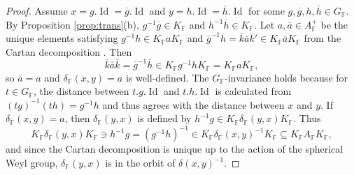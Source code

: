 \documentclass[12pt]{amsart}
\newcommand{\F}{\mathbb{F} }
\newcommand{\ApF}{A_\F^+}
\newcommand{\Id}{\operatorname{Id} }
\newcommand{\tran}{{^{\mathsf{T}}\!}}
\numberwithin{equation}{section}
\theoremstyle{remark} %
\begin{document}
\begin{proof}
	Assume $x=g.\Id = \overline{g}.\Id$ and $y=h.\Id = \overline{h}.\Id$ for some $g,\overline{g}, h, \overline{h} \in G_\F$. By Proposition \ref{prop:trans}(b), $g^{-1}\overline{g} \in K_\F$ and $h^{-1}\overline{h} \in K_\F$. Let $a,\overline{a}\in A_\F^+$ be the unique elements satisfying $g^{-1}h \in K_\F a K_\F$ and $\overline{g}^{-1}\overline{h} = \overline{k}\overline{a}\overline{k}' \in K_\F \overline{a} K_\F$ from the Cartan decomposition \cite[Theorem \ref{I-thm:KAK}]{AppAGRCF}. Then
	$$
	\overline{k}\overline{a}\overline{k}= \overline{g}^{-1}\overline{h} \in K_\F g^{-1}  h K_\F = K_\F a K_\F,
	$$
	so $\overline{a} = a$ and $\delta_\F(x,y) = a$ is well-defined. The $G_\F$-invariance holds because for $t \in G_\F$, the distance between $t.g.\Id$ and $t.h.\Id$ is calculated from $(t g)^{-1}(t h) = g^{-1}h$ and thus agrees with the distance between $x$ and $y$. If $\delta_\F(x,y) = a$, then $\delta_\F(y,x)$ is defined by $h^{-1}g \in K_\F \delta_\F(y,x) K_\F$. Thus 
	$$
	K_\F \delta_\F(y,x) K_\F \ni h^{-1}g = (g^{-1}h)^{-1} \in K_\F \delta_\F(x,y)^{-1} K_\F \subseteq K_\F A_\F K_\F,
	$$
	and since the Cartan decomposition is unique up to the action of the spherical Weyl group, $\delta_\F(y,x)$ is in the orbit of $\delta(x,y)^{-1}$.
\end{proof}
\end{document}
